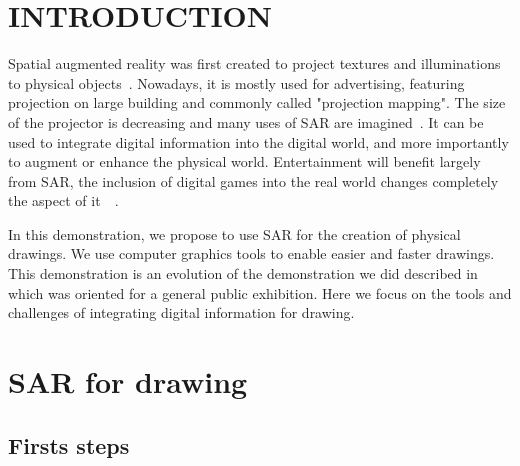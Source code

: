 \documentclass{article}
\begin{document}




\section{INTRODUCTION}

Spatial augmented reality was first created to project textures and illuminations to physical objects~\cite{raskar1999table}. Nowadays, it is mostly used for advertising, featuring projection on large building and commonly called "projection mapping". 
The size of the projector is decreasing and many uses of SAR are imagined~\cite{mistry2009sixthsense}\cite{harrison2011omnitouch}. 
It can be used to integrate digital information into the digital world, and more importantly to augment or enhance the physical world.
Entertainment will benefit largely from SAR, the inclusion of digital games into the real world changes completely the aspect of it~\cite{wilson2007depth}~\cite{jones2010build}.

In this demonstration, we propose to use SAR for the creation of physical drawings. We use computer graphics tools to enable easier and faster drawings. This demonstration is an evolution of the demonstration we did described in~\cite{laviole:2012} which was oriented for a general public exhibition. Here we focus on the tools and challenges of integrating digital information for drawing.  


\section{SAR for drawing}
\subsection{Firsts steps}
\end{document}
